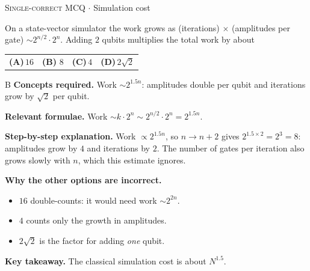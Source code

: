 \documentclass[11pt,a4paper]{article}
\newcommand{\optlabel}[1]{\textbf{(#1)}}
\newcommand{\correctlabel}[1]{\textcolor{okgreen}{\textbf{(#1)}\,\ding{51}}}
\newenvironment{qitem}[1]{\begin{list}{}{\setlength{\leftmargin}{3.3em}\setlength{\labelwidth}{3.1em}%
  \setlength{\labelsep}{0.2em}\setlength{\topsep}{3pt}\setlength{\parsep}{3pt}}\item[\textbf{Q.#1}\hfill]}{\end{list}}
\newcommand{\qsep}{\par\vspace{2pt}{\color{black!15}\hrule}\vspace{4pt}}
\newcommand{\qmeta}[2]{{\footnotesize\color{black!60}\textsc{#1} \;$\cdot$\; #2}\par}
\begin{document}
\begin{qitem}{71}
\qmeta{Single-correct MCQ}{Simulation cost}
On a state-vector simulator the work grows as (iterations) $\times$ (amplitudes per gate) $\sim 2^{n/2}\cdot2^{n}$. Adding $2$ qubits multiplies the total work by about
\par\smallskip\noindent\begin{tabularx}{\linewidth}{@{}*{4}{L}@{}}
\optlabel{A}\,$16$ & \correctlabel{B}\,$8$ & \optlabel{C}\,$4$ & \optlabel{D}\,$2\sqrt2$
\end{tabularx}
\end{qitem}
\begin{solbox}{B}
\textbf{\color{brand}Concepts required.} Work $\sim 2^{1.5n}$: amplitudes double per qubit and iterations grow by $\sqrt2$ per qubit.

\textbf{\color{brand}Relevant formulae.} Work $\sim k\cdot2^n \sim 2^{n/2}\cdot2^n = 2^{1.5n}$.

\textbf{\color{brand}Step-by-step explanation.} Work $\propto 2^{1.5n}$, so $n \to n + 2$ gives $2^{1.5\times2} = 2^3 = 8$: amplitudes grow by $4$ and iterations by $2$. The number of gates per iteration also grows slowly with $n$, which this estimate ignores.

\textbf{\color{brand}Why the other options are incorrect.}
\begin{itemize}[leftmargin=2.4em, itemsep=1pt, topsep=2pt]
\item[\textbf{(A)}] $16$ double-counts: it would need work $\sim 2^{2n}$.
\item[\textbf{(C)}] $4$ counts only the growth in amplitudes.
\item[\textbf{(D)}] $2\sqrt2$ is the factor for adding \emph{one} qubit.
\end{itemize}
\textbf{\color{brand}Key takeaway.} The classical simulation cost is about $N^{1.5}$.
\end{solbox}
\qsep
\end{document}
